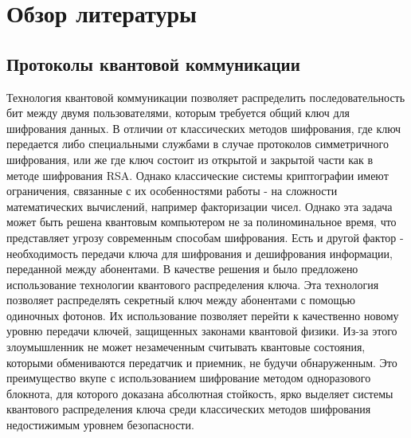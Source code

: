 \chapter{Обзор литературы}\label{ch:ch1}


\section{Протоколы квантовой коммуникации}\label{sec:ch1/sect2}
Технология квантовой коммуникации позволяет распределить последовательность бит между двумя пользователями,  которым требуется общий ключ для шифрования данных. В отличии от классических методов шифрования, где ключ передается либо специальными службами в случае протоколов симметричного шифрования, или же где ключ состоит из открытой и закрытой части как в методе шифрования RSA. Однако классические системы криптографии имеют ограничения, связанные с их особенностями работы - на сложности математических  вычислений, например факторизации чисел. Однако эта задача может быть решена квантовым компьютером не за полиноминальное время, что представляет угрозу современным способам шифрования.  Есть и другой фактор - необходимость передачи ключа для шифрования и дешифрования информации, переданной между абонентами. 
В качестве решения и было предложено использование технологии квантового распределения ключа. Эта технология позволяет распределять секретный ключ между абонентами с помощью одиночных фотонов. Их использование позволяет перейти к качественно новому уровню передачи ключей, защищенных законами квантовой физики. Из-за этого злоумышленник не может незамеченным считывать квантовые состояния, которыми обмениваются передатчик и приемник, не будучи обнаруженным. Это преимущество вкупе с использованием шифрование методом одноразового блокнота, для которого доказана абсолютная стойкость, ярко выделяет системы квантового распределения ключа среди классических методов шифрования недостижимым уровнем безопасности. 


